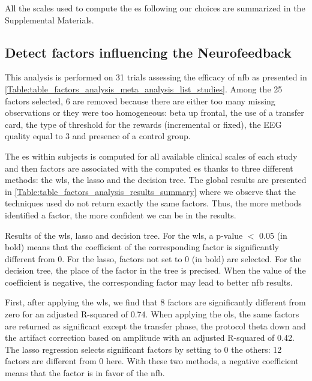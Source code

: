 All the scales used to compute the \gls{es} following our choices are summarized in the Supplemental Materials.

\subsection{Detect factors influencing the Neurofeedback}

This analysis is performed on 31 trials assessing the efficacy of \gls{nfb} as presented in \cref{Table:table_factors_analysis_meta_analysis_list_studies}. 
Among the 25 factors selected, 6 are removed because there are either too many missing observations or they were too homogeneous: beta up frontal, 
the use of a transfer card, the type of threshold for the rewards (incremental or fixed), the EEG quality equal to 3 and presence of a control group. 

The \gls{es} within subjects is computed for all available clinical scales of each study and then factors are associated with the computed \gls{es}
thanks to three different methods: the \gls{wls}, the \gls{lasso} and the decision tree. The global results are presented in \cref{Table:table_factors_analysis_results_summary}
where we observe that the techniques used do not return exactly the same factors. Thus, the more methods identified a factor, the more confident we can be in
the results.  

\begin{table}[h!]
  \centering
  \caption{Results of the \gls{wls}, \gls{lasso} and decision tree. For the \gls{wls}, a p-value $<$ 0.05 (in bold) means that the coefficient of 
	the corresponding factor is significantly different from 0. For the \gls{lasso}, factors not set to 0 (in bold) are selected. For the decision tree,
	the place of the factor in the tree is precised. When the value of the coefficient is negative, the corresponding factor may lead to better \gls{nfb} results.}
  
  \label{Table:table_factors_analysis_results_summary}
\end{table}

First, after applying the \gls{wls}, we find that 8 factors are significantly different from zero for an adjusted R-squared of 0.74. 
When applying the \gls{ols}, the same factors are returned as significant except the transfer phase, the protocol theta down and the artifact correction
based on amplitude with an adjusted R-squared of 0.42. The \gls{lasso} regression selects significant factors by setting to 0 the others: 12 factors 
are different from 0 here. With these two methods, a negative coefficient means that the factor is in favor of the \gls{nfb}.

